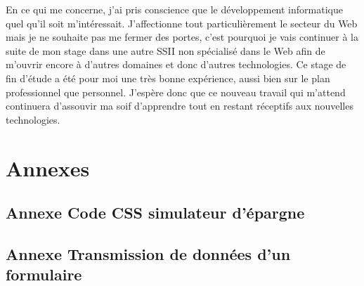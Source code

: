 \documentclass[a4paper,11pt,twoside]{report}
\begin{document}
  En ce qui me concerne, j'ai pris conscience que le développement informatique quel qu'il soit m'intéressait. J'affectionne tout particulièrement le secteur du Web mais je ne souhaite pas me fermer des portes, c'est pourquoi je vais continuer à la suite de mon stage dans une autre SSII non spécialisé dans le Web afin de m'ouvrir encore à d'autres domaines et donc d'autres technologies. Ce stage de fin d'étude a été pour moi une très bonne expérience, aussi bien sur le plan professionnel que personnel. J'espère donc que ce nouveau travail qui m'attend continuera d'assouvir ma soif d'apprendre tout en restant réceptifs aux nouvelles technologies.
\chapter*{Annexes}
\thispagestyle{\chead{ }}
  
  \section*{Annexe Code CSS simulateur d'épargne}
  \label{code_CSS_simulateur_d_epargne}
  
  
    \newpage
  
  \section*{Annexe Transmission de données d'un formulaire}
  \label{transmission_de_donnees_d_un_formulaire}
  
  
    \newpage
  
\end{document}

